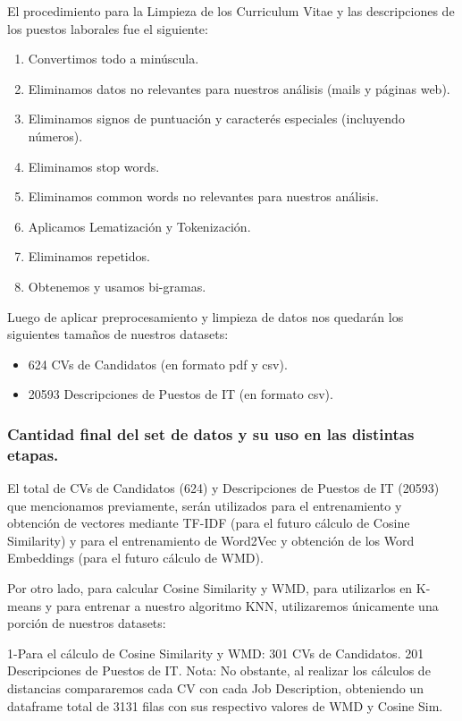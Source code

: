 \documentclass[12pt,a4paper]{article}
\begin{document}
El procedimiento para la Limpieza de los Curriculum Vitae y las descripciones de los puestos laborales fue el siguiente:

\begin{enumerate}
\item Convertimos todo a minúscula.
\item Eliminamos datos no relevantes para nuestros análisis (mails y páginas web).
\item Eliminamos signos de puntuación y caracterés especiales (incluyendo números).
\item Eliminamos stop words.
\item Eliminamos common words no relevantes para nuestros análisis.
\item Aplicamos Lematización y Tokenización.
\item Eliminamos repetidos.
\item Obtenemos y usamos bi-gramas.
\end{enumerate}

Luego de aplicar preprocesamiento y limpieza de datos nos quedarán los siguientes tamaños de nuestros datasets:
\begin{itemize}
\item 624 CVs de Candidatos (en formato pdf y csv).
\item 20593 Descripciones de Puestos de IT (en formato csv).
\end{itemize}

\subsubsection{Cantidad final del set de datos y su uso en las distintas etapas.}

El total de CVs de Candidatos (624) y Descripciones de Puestos de IT (20593) que mencionamos previamente, serán utilizados para el entrenamiento y obtención de vectores mediante TF-IDF (para el futuro cálculo de Cosine Similarity) y para el entrenamiento de Word2Vec y obtención de los Word Embeddings (para el futuro cálculo de WMD).

Por otro lado, para calcular Cosine Similarity y WMD, para utilizarlos en K-means y para entrenar a nuestro algoritmo KNN, utilizaremos únicamente una porción de nuestros datasets:

    1-Para el cálculo de Cosine Similarity y WMD:
        301 CVs de Candidatos.
        201 Descripciones de Puestos de IT.
        Nota: No obstante, al realizar los cálculos de distancias compararemos cada CV con cada Job Description, obteniendo un dataframe total de 3131 filas con sus respectivo valores de WMD y Cosine Sim.
\end{document}
